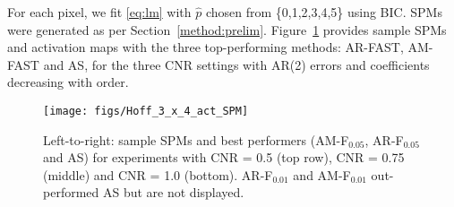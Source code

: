 For each pixel, we fit \eqref{eq:lm}  with $\hat p$
chosen from \{0,1,2,3,4,5\} using BIC. SPMs were generated as per
Section~\ref{method:prelim}. Figure~\ref{fig:sim.phant} provides
sample SPMs and activation maps with the three top-performing methods: AR-FAST, AM-FAST and AS, for the three CNR
settings with AR(2) errors and coefficients decreasing with order.
\begin{figure}[h]
  \begin{center}
\texttt{[image: figs/Hoff\_3\_x\_4\_act\_SPM]}
\caption{Left-to-right: sample SPMs and best performers (AM-F$_{0.05}$,
  AR-F$_{0.05}$ and AS) for experiments with CNR = 0.5 (top row), CNR
  = 0.75 (middle) and CNR = 1.0 (bottom). AR-F$_{0.01}$ and
  AM-F$_{0.01}$ out-performed AS but are not displayed.}
\label{fig:sim.phant}
  \end{center}
\end{figure}
\begin{comment}
\begin{figure}[h]
  \centering
\texttt{[image: figures/Hoff\_3x6\_act]}
  \caption{SPM for a  sample simulation case of decreasing AR coefficients, for the sixth methods settings (from left to right) of AWS, AS, AM-FAST, AR-FAST, TFCE, permutation test. The three rows (from top to bottom) correspond   to simulation settings with CNR of 0.5, 0.75 and 1.0, respectively.}
  \label{fig:sim.phant}
\end{figure}
\end{comment}
\begin{comment}
was done with AM-FAST and AR-FAST and also the commonly-used (in fMRI) cluster-thresholding (CT) at ~\citet{wooetal14}'s suggested significance level ($\alpha\!=\!0.001$) with a second-order neighborhood and number of voxels determined by ~\citet{cox96}'s {\tt 3dClustSim} function. The R package  {\tt AnalyzeFMRI}~\citep{bordieretal11} was used to perform cluster-wise
thresholding. We also performed adaptive weight smoothing, (AWS) ~\citep{tabelowetal06}, structural adaptive segmentation, (AS)~\citep{polzehletal10}~ using the R package {\tt fmri}~\citep{tabelowandpolzehl11}. A reviewer asked us to compare our methodology with distribution-free approaches. We performed permutation test and thresholding-free cluster enhacement (TFCE) ~\citep{smithandnichols09}, these function are in the R package {\tt permuco}.  In each case, performance was evaluated in terms of the overlap Jaccard Index \citep{jaccard1901,maitra10} between the estimated activation map and the truth as per Figure~\ref{fig:Hoff}. The same reviewer asked us to add false-positive rate, we also reported the false-negative rate, true-positive rate and true negative rate for our proposed methodology as well competeting methods.
\end{comment}
